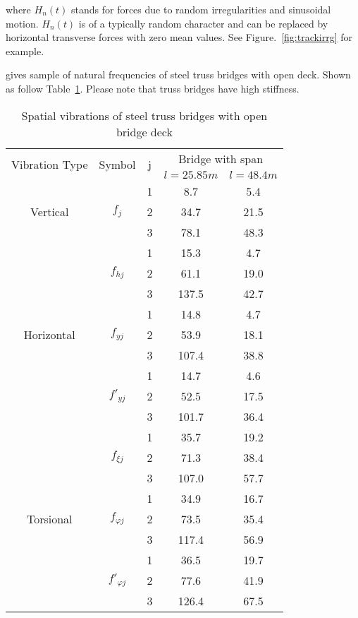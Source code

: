 where $ H_n(t) $ stands for forces due to random irregularities and sinusoidal motion. $ H_n(t) $ is of a typically random character and can be replaced by horizontal transverse forces with zero mean values. See Figure.~\ref{fig:trackirrg} for example.

\cite[Table 9.1]{fryba1996dynamics} gives sample of natural frequencies of steel truss bridges with open deck. Shown as follow Table~\ref{tab:spatialvibrationsteel}. Please note that truss bridges have high stiffness.

\begin{table}[h]
	\centering
	\begin{tabular}{ccccc}
		\hline
		\multirow{2}{*}{Vibration Type} & \multirow{2}{*}{Symbol} & \multirow{2}{*}{j} & \multicolumn{2}{c}{Bridge with span} \\
		\cline{4-5}
		 & & & $ l=25.85m $ & $ l=48.4m $\\
		\hline
		\multirow{3}{*}{Vertical} & \multirow{3}{*}{$ f_j $} & 1 & 8.7 & 5.4\\
		 & & 2 & 34.7 & 21.5 \\
	 	 & & 3 & 78.1 & 48.3 \\
	 	\hline
	 	\multirow{9}{*}{Horizontal} & \multirow{3}{*}{$ f_{hj} $} & 1 & 15.3 & 4.7 \\
	 	 & & 2 & 61.1 & 19.0 \\
	 	 & & 3 & 137.5 & 42.7 \\
	 	\cline{2-5}
	 	 & \multirow{3}{*}{$ f_{yj} $} & 1 & 14.8 & 4.7 \\
	 	 & & 2 & 53.9 & 18.1 \\
	 	 & & 3 & 107.4 & 38.8 \\ 
	 	\cline{2-5}
	 	 & \multirow{3}{*}{$ {f}'_{yj} $} & 1 & 14.7 & 4.6 \\
	 	 & & 2 & 52.5 & 17.5 \\
	 	 & & 3 & 101.7 & 36.4 \\ 
	 	\cline{2-5}
	 	\hline
	 	\multirow{9}{*}{Torsional} & \multirow{3}{*}{$ f_{\xi j} $} & 1 & 35.7 & 19.2 \\
	 	 & & 2 & 71.3 & 38.4 \\
	 	 & & 3 & 107.0 & 57.7 \\
	 	\cline{2-5}
	 	 & \multirow{3}{*}{$ f_{\varphi j} $} & 1 & 34.9 & 16.7 \\
	 	 & & 2 & 73.5 & 35.4 \\
	 	 & & 3 & 117.4 & 56.9 \\ 
	 	\cline{2-5}
	 	 & \multirow{3}{*}{$ {f}'_{\varphi j} $} & 1 & 36.5 & 19.7 \\
	 	 & & 2 & 77.6 & 41.9 \\
	 	 & & 3 & 126.4 & 67.5 \\ 
	 	\hline
	\end{tabular}
	\caption{Spatial vibrations of steel truss bridges with open bridge deck}
	\label{tab:spatialvibrationsteel}
\end{table}



